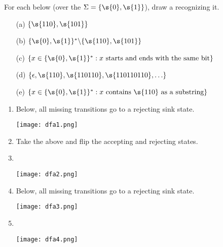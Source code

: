 \begin{flex}
\begin{exercise}  \label{exercise:Draw-DFAs}
For each  below (over the  $\Sigma = \{\s{0},\s{1}\}$), draw a  recognizing it.
\begin{enumerate}
    \item[(a)] $\{\s{110}, \s{101}\}$ 
    \item[(b)] $\{\s{0},\s{1}\}^* \backslash \{\s{110}, \s{101}\}$
    \item[(c)] $\{x \in \{\s{0},\s{1}\}^* : \text{$x$ starts and ends with the same bit}\}$
    \item[(d)] $\{\epsilon, \s{110}, \s{110110}, \s{110110110}, \ldots\}$
    \item[(e)] $\{x \in \{\s{0},\s{1}\}^*: \text{$x$ contains $\s{110}$ as a substring}\}$
\end{enumerate}
\end{exercise}
\begin{solution}
\begin{enumerate}[label=(\alph*)] 
    \item Below, all missing transitions go to a rejecting sink state.
    \begin{center}
        \texttt{[image: dfa1.png]}
    \end{center}
    \item Take the  above and flip the accepting and rejecting states.
    \item \
    \begin{center}
        \texttt{[image: dfa2.png]}
    \end{center}
    \item Below, all missing transitions go to a rejecting sink state.
    \begin{center}
        \texttt{[image: dfa3.png]}
    \end{center}
    \item \
    \begin{center}
        \texttt{[image: dfa4.png]}
    \end{center}
\end{enumerate}
\end{solution}
\end{flex}


